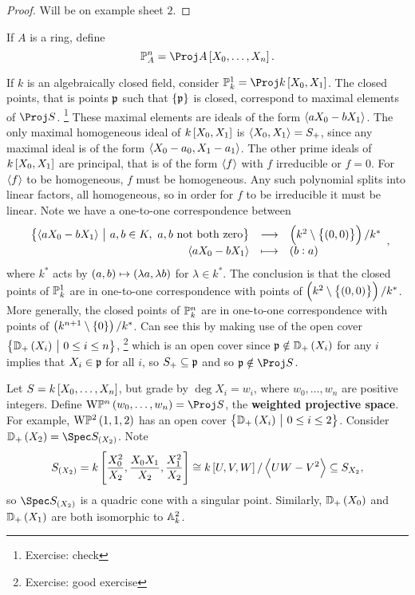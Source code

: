 \begin{proof}
Will be on example sheet $ 2 $.
\end{proof}

\begin{definition*}
If $ A $ is a ring, define
$$ \PP_A^n = \Proj A\sbr{X_0, \dots, X_n}. $$
\end{definition*}

\begin{example*}
If $ k $ is an algebraically closed field, consider $ \PP_k^1 = \Proj k\sbr{X_0, X_1} $. The closed points, that is points $ \ppp $ such that $ \cbr{\ppp} $ is closed, correspond to maximal elements of $ \Proj S $. \footnote{Exercise: check} These maximal elements are ideals of the form $ \abr{aX_0 - bX_1} $. The only maximal homogeneous ideal of $ k\sbr{X_0, X_1} $ is $ \abr{X_0, X_1} = S_+ $, since any maximal ideal is of the form $ \abr{X_0 - a_0, X_1 - a_1} $. The other prime ideals of $ k\sbr{X_0, X_1} $ are principal, that is of the form $ \abr{f} $ with $ f $ irreducible or $ f = 0 $. For $ \abr{f} $ to be homogeneous, $ f $ must be homogeneous. Any such polynomial splits into linear factors, all homogeneous, so in order for $ f $ to be irreducible it must be linear. Note we have a one-to-one correspondence between
$$ \function{\cbr{\abr{aX_0 - bX_1} \st a, b \in K, \ a, b \ \text{not both zero}}}{\br{k^2 \setminus \cbr{\br{0, 0}}} / k^*}{\abr{aX_0 - bX_1}}{\br{b : a}}, $$
where $ k^* $ acts by $ \br{a, b} \mapsto \br{\lambda a, \lambda b} $ for $ \lambda \in k^* $. The conclusion is that the closed points of $ \PP_k^1 $ are in one-to-one correspondence with points of $ \br{k^2 \setminus \cbr{\br{0, 0}}} / k^* $. More generally, the closed points of $ \PP_k^n $ are in one-to-one correspondence with points of $ \br{k^{n + 1} \setminus \cbr{0}} / k^* $. Can see this by making use of the open cover $ \cbr{\DD_+\br{X_i} \st 0 \le i \le n} $, \footnote{Exercise: good exercise} which is an open cover since $ \ppp \notin \DD_+\br{X_i} $ for any $ i $ implies that $ X_i \in \ppp $ for all $ i $, so $ S_+ \subseteq \ppp $ and so $ \ppp \notin \Proj S $.
\end{example*}

\begin{example*}
Let $ S = k\sbr{X_0, \dots, X_n} $, but grade by $ \deg X_i = w_i $, where $ w_0, \dots, w_n $ are positive integers. Define $ \W\PP^n\br{w_0, \dots, w_n} = \Proj S $, the \textbf{weighted projective space}. For example, $ \W\PP^2\br{1, 1, 2} $ has an open cover $ \cbr{\DD_+\br{X_i} \st 0 \le i \le 2} $. Consider $ \DD_+\br{X_2} = \Spec S_{\br{X_2}} $. Note
$$ S_{\br{X_2}} = k\sbr{\dfrac{X_0^2}{X_2}, \dfrac{X_0X_1}{X_2}, \dfrac{X_1^2}{X_2}} \cong k\sbr{U, V, W} / \abr{UW - V^2} \subseteq S_{X_2}, $$
so $ \Spec S_{\br{X_2}} $ is a quadric cone with a singular point. Similarly, $ \DD_+\br{X_0} $ and $ \DD_+\br{X_1} $ are both isomorphic to $ \AA_k^2 $.
\end{example*}

